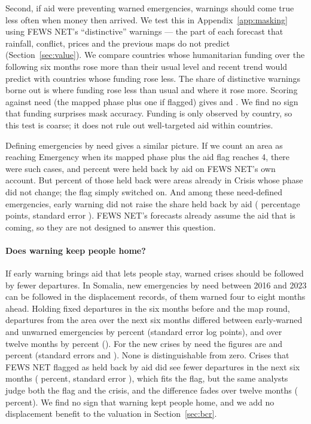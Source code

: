 \documentclass[11pt]{article}
\begin{document}
Second, if aid were preventing warned emergencies, warnings should come true less often when money then arrived. We test this in Appendix~\ref{app:masking} using FEWS NET's ``distinctive'' warnings --- the part of each forecast that rainfall, conflict, prices and the previous maps do not predict (Section~\ref{sec:value}). We compare countries whose humanitarian funding over the following six months rose more than their usual level and recent trend would predict with countries whose funding rose less. The share of distinctive warnings borne out is \maskMappedLow{} where funding rose less than usual and \maskMappedHigh{} where it rose more. Scoring against need (the mapped phase plus one if flagged) gives \maskNeedLow{} and \maskNeedHigh{}. We find no sign that funding surprises mask accuracy. Funding is only observed by country, so this test is coarse; it does not rule out well-targeted aid within countries.

Defining emergencies by need gives a similar picture. If we count an area as reaching Emergency when its mapped phase plus the aid flag reaches 4, there were \needOnsets{} such cases, and \needHeld{} percent were held back by aid on FEWS NET's own account. But \needHeldSteady{} percent of those held back were areas already in Crisis whose phase did not change; the flag simply switched on. And among these need-defined emergencies, early warning did not raise the share held back by aid (\needEarly{} percentage points, standard error \needEarlySe{}). FEWS NET's forecasts already assume the aid that is coming, so they are not designed to answer this question.

\paragraph{Does warning keep people home?} If early warning brings aid that lets people stay, warned crises should be followed by fewer departures. In Somalia, \dispOnEm{} new emergencies by need between 2016 and 2023 can be followed in the displacement records, \dispOnEmEarly{} of them warned four to eight months ahead. Holding fixed departures in the six months before and the map round, departures from the area over the next six months differed between early-warned and unwarned emergencies by \dispOnEmEarlySix{} percent (standard error \dispOnEmEarlySixSe{} log points), and over twelve months by \dispOnEmEarlyTwelve{} percent (\dispOnEmEarlyTwelveSe{}). For the \dispOnCr{} new crises by need the figures are \dispOnCrEarlySix{} and \dispOnCrEarlyTwelve{} percent (standard errors \dispOnCrEarlySixSe{} and \dispOnCrEarlyTwelveSe{}). None is distinguishable from zero. Crises that FEWS NET flagged as held back by aid did see fewer departures in the next six months (\dispOnCrAvertedSix{} percent, standard error \dispOnCrAvertedSixSe{}), which fits the flag, but the same analysts judge both the flag and the crisis, and the difference fades over twelve months (\dispOnCrAvertedTwelve{} percent). We find no sign that warning kept people home, and we add no displacement benefit to the valuation in Section~\ref{sec:bcr}.
\end{document}
